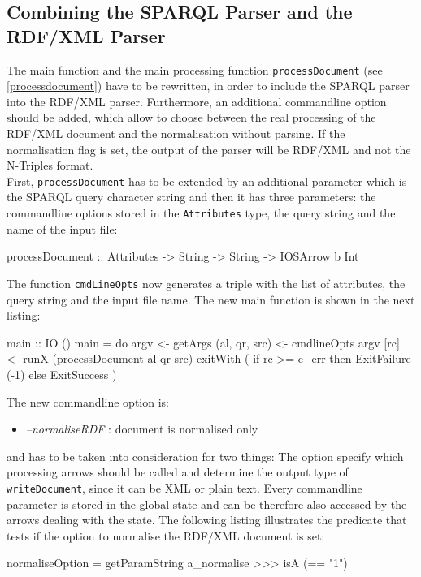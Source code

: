 \documentclass[11pt,a4paper,headsepline, bibtotoc]{scrreprt}
\begin{document}
\subsection{Combining the SPARQL Parser and the RDF/XML Parser}
The main function and the main processing function \texttt{processDocument} (see \ref{processdocument}) have to be rewritten, in order to include the SPARQL parser into the RDF/XML parser. Furthermore, an additional commandline option should be added, which allow to choose between the real processing of the RDF/XML document and the normalisation without parsing. If the normalisation flag is set, the output of the parser will be RDF/XML and not the N-Triples format.\\
First, \texttt{processDocument} has to be extended by an additional parameter which is the SPARQL query character string and then it has three parameters: the commandline options stored in the \texttt{Attributes} type, the query string and the name of the input file:
\begin{code}[basicstyle=\ttfamily\small]
processDocument :: Attributes -> String -> String -> IOSArrow b Int
\end{code}
The function \texttt{cmdLineOpts} now generates a triple with the list of attributes, the query string and the input file name. The new main function is shown in the next listing:
\clearpage
\begin{code}[caption=Final Main Function]
main :: IO ()
main = do
       argv <- getArgs         
       (al, qr, src) <- cmdlineOpts argv
       [rc] <- runX (processDocument al qr src)
       exitWith ( if rc >= c_err
                  then ExitFailure (-1)
                  else ExitSuccess )
\end{code}
The new commandline option is:
\begin{itemize}
    \item[] \textit{--normaliseRDF} : document is normalised only
\end{itemize}
and has to be taken into consideration for two things: The option specify which processing arrows should be called and determine the output type of \texttt{writeDocument}, since it can be XML or plain text. Every commandline parameter is stored in the global state and can be therefore also accessed by the arrows dealing with the state. The following listing illustrates the predicate that tests if the option to normalise the RDF/XML document is set:
\begin{code}
normaliseOption = getParamString a_normalise >>> isA (== "1")
\end{code}
\end{document}
